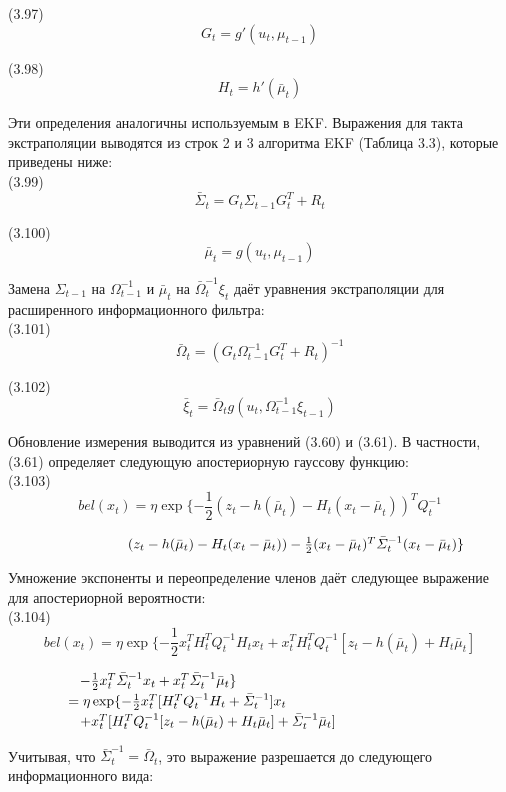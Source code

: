 \documentclass[10pt,a4paper]{article}
\begin{document}
(3.97)
$$G_t=g'(u_t,\mu_{t-1})$$

(3.98)
$$H_t=h'(\bar{\mu}_t)$$
 
Эти определения аналогичны используемым в EKF. Выражения для такта экстраполяции выводятся из строк 2 и 3 алгоритма EKF (Таблица 3.3), которые приведены ниже:\\

(3.99)
$$\bar{\varSigma}_t=G_t\varSigma_{t-1}G_t^T+R_t$$

(3.100)
$$\bar{\mu}_t=g(u_t,\mu_{t-1})$$

Замена $\varSigma_{t-1}$ на $\varOmega_{t-1}^{-1}$ и $\bar{\mu}_t$ на $\bar{\varOmega}_t^{-1}\xi_t$
даёт уравнения экстраполяции для расширенного информационного фильтра:\\

(3.101)
$$\bar{\varOmega}_t=(G_t\varOmega_{t-1}^{-1}G_t^T+R_t)^{-1}$$

(3.102)
$$\bar{\xi}_t=\bar{\varOmega}_t g(u_t,\varOmega_{t-1}^{-1}\xi_{t-1})$$
 
Обновление измерения выводится из уравнений (3.60) и (3.61). В частности, (3.61) определяет следующую апостериорную гауссову функцию:\\

(3.103)
$$bel(x_t)=\eta\exp\{ -\frac{1}{2}(z_t-h(\bar{\mu}_t)-H_t(x_t-\bar{\mu}_t))^T Q_t^{-1}$$

$\hspace{30mm}(z_t-h(\bar{\mu}_t)-H_t(x_t-\bar{\mu}_t))-\frac{1}{2}(x_t-\bar{\mu}_t)^T\bar{\varSigma}_t^{-1}(x_t-\bar{\mu}_t)\} $

Умножение экспоненты и переопределение членов даёт следующее выражение для апостериорной вероятности:\\

(3.104)
$$bel(x_t)=\eta\exp\{-\frac{1}{2}x_t^T H_t^T Q_t^{-1}H_t x_t+x_t^T H_t^T Q_t^{-1}[z_t-h(\bar{\mu}_t)+H_t\bar{\mu}_t]$$

$\hspace{18mm}-\frac{1}{2}x_t^T\bar{\varSigma}_t^{-1}x_t+x_t^T\bar{\varSigma}_t^{-1}\bar{\mu}_t\}$\\

$\hspace{15mm}=\eta\exp\{-\frac{1}{2}x_t^T[H_t^T Q_t^{-1}H_t+\bar{\varSigma}_t^{-1}]x_t$\\

$\hspace{18mm}+x_t^T[H_t^T Q_t^{-1}[z_t-h(\bar{\mu}_t)+H_t\bar{\mu}_t]+\bar{\varSigma}_t^{-1}\bar{\mu}_t]$

Учитывая, что $\bar{\varSigma}_t^{-1}=\bar{\varOmega}_t$, это выражение разрешается до следующего информационного вида:\\
\end{document}
